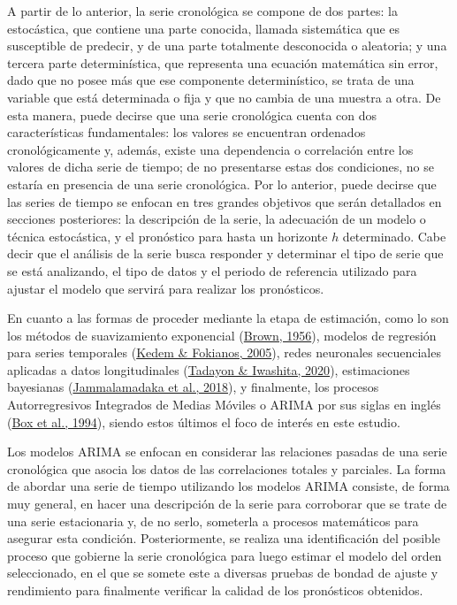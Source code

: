 \documentclass[
]{article}
\begin{document}
A partir de lo anterior, la serie cronológica se compone de dos partes:
la estocástica, que contiene una parte conocida, llamada sistemática que
es susceptible de predecir, y de una parte totalmente desconocida o
aleatoria; y una tercera parte determinística, que representa una
ecuación matemática sin error, dado que no posee más que ese componente
determinístico, se trata de una variable que está determinada o fija y
que no cambia de una muestra a otra. De esta manera, puede decirse que
una serie cronológica cuenta con dos características fundamentales: los
valores se encuentran ordenados cronológicamente y, además, existe una
dependencia o correlación entre los valores de dicha serie de tiempo; de
no presentarse estas dos condiciones, no se estaría en presencia de una
serie cronológica. Por lo anterior, puede decirse que las series de
tiempo se enfocan en tres grandes objetivos que serán detallados en
secciones posteriores: la descripción de la serie, la adecuación de un
modelo o técnica estocástica, y el pronóstico para hasta un horizonte
\(h\) determinado. Cabe decir que el análisis de la serie busca
responder y determinar el tipo de serie que se está analizando, el tipo
de datos y el periodo de referencia utilizado para ajustar el modelo que
servirá para realizar los pronósticos.

En cuanto a las formas de proceder mediante la etapa de estimación, como
lo son los métodos de suavizamiento exponencial
(\protect\hyperlink{ref-brown}{Brown, 1956}), modelos de regresión para
series temporales (\protect\hyperlink{ref-kedem}{Kedem \& Fokianos,
2005}), redes neuronales secuenciales aplicadas a datos longitudinales
(\protect\hyperlink{ref-redes}{Tadayon \& Iwashita, 2020}), estimaciones
bayesianas (\protect\hyperlink{ref-bayes}{Jammalamadaka et al., 2018}),
y finalmente, los procesos Autorregresivos Integrados de Medias Móviles
o ARIMA por sus siglas en inglés
(\protect\hyperlink{ref-box-jenkins}{Box et al., 1994}), siendo estos
últimos el foco de interés en este estudio.

Los modelos ARIMA se enfocan en considerar las relaciones pasadas de una
serie cronológica que asocia los datos de las correlaciones totales y
parciales. La forma de abordar una serie de tiempo utilizando los
modelos ARIMA consiste, de forma muy general, en hacer una descripción
de la serie para corroborar que se trate de una serie estacionaria y, de
no serlo, someterla a procesos matemáticos para asegurar esta condición.
Posteriormente, se realiza una identificación del posible proceso que
gobierne la serie cronológica para luego estimar el modelo del orden
seleccionado, en el que se somete este a diversas pruebas de bondad de
ajuste y rendimiento para finalmente verificar la calidad de los
pronósticos obtenidos.
\end{document}
